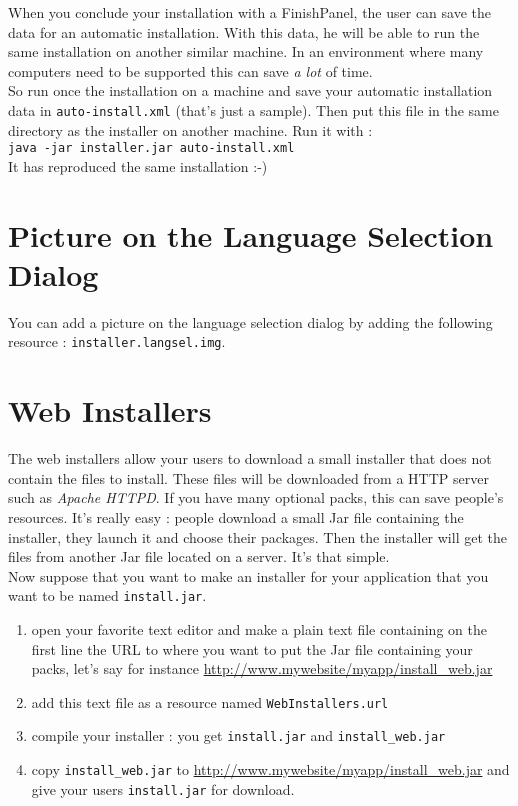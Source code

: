 When you conclude your installation with a FinishPanel, the user can
save the data for an automatic installation. With this data, he will be
able to run the same installation on another similar machine. In an
environment where many computers need to be supported this can save
\textsl{a lot} of time.\\

So run once the installation on a machine and save your automatic installation
data in \texttt{auto-install.xml} (that's just a sample). Then put this file in
the same directory as the installer on another machine. Run it with :\\
\texttt{java -jar installer.jar auto-install.xml}\\

It has reproduced the same installation :-)\\

\section{Picture on the Language Selection Dialog}

You can add a picture on the language selection dialog by adding the following
resource : \texttt{installer.langsel.img}.\\

\section{Web Installers}

The web installers allow your users to download a small installer that does not
contain the files to install. These files will be downloaded from a HTTP server
such as \textit{Apache HTTPD}. If you have many optional packs, this can save
people's resources. It's really easy : people download a small Jar
file containing the installer, they launch it and choose their
packages. Then the installer will get the files from another Jar file
located on a server. It's that simple.\\

Now suppose that you want to make an installer for your application
that you want to be named \texttt{install.jar}.
\begin{enumerate}
  \item open your favorite text editor and make a plain text file
  containing on the first line the URL to where you want to put the
  Jar file containing your packs, let's say for instance
  \url{http://www.mywebsite/myapp/install_web.jar}
  \item add this text file as a resource named
  \texttt{WebInstallers.url}
  \item compile your installer : you get \texttt{install.jar} and
  \texttt{install\_web.jar}
  \item copy \texttt{install\_web.jar} to
  \url{http://www.mywebsite/myapp/install_web.jar} and give your
  users \texttt{install.jar} for download.
\end{enumerate}\

